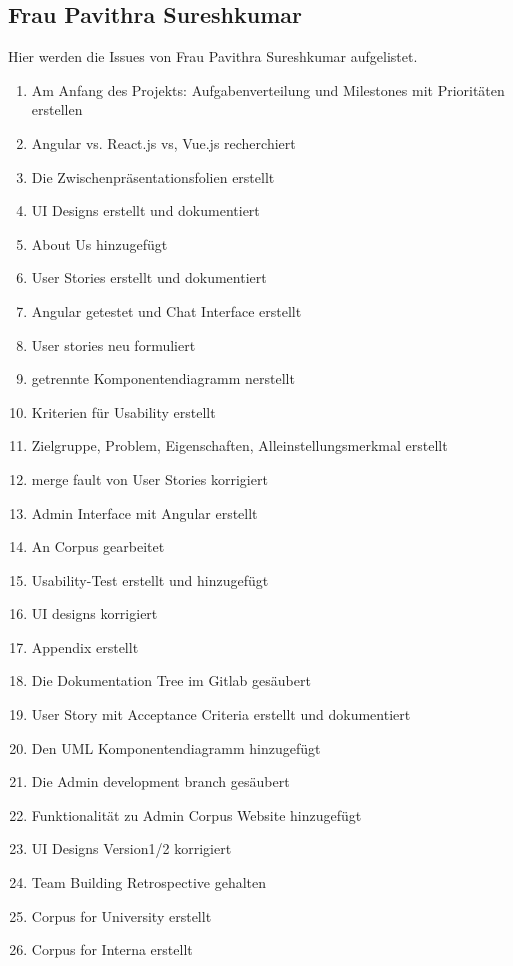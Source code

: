 \subsection{Frau Pavithra Sureshkumar}
Hier werden die Issues von Frau Pavithra Sureshkumar aufgelistet.
\begin{enumerate}
    \item Am Anfang des Projekts: Aufgabenverteilung und Milestones mit Prioritäten erstellen 
    \item Angular vs. React.js vs, Vue.js recherchiert
    \item Die Zwischenpräsentationsfolien erstellt
    \item UI Designs erstellt und dokumentiert
    \item About Us hinzugefügt
    \item User Stories erstellt und dokumentiert
    \item Angular getestet und Chat Interface erstellt
    \item User stories neu formuliert
    \item getrennte Komponentendiagramm nerstellt
    \item Kriterien für Usability erstellt
    \item Zielgruppe, Problem, Eigenschaften, Alleinstellungsmerkmal erstellt
    \item merge fault von User Stories korrigiert
    \item Admin Interface mit Angular erstellt
    \item An Corpus gearbeitet
    \item Usability-Test erstellt und hinzugefügt
    \item UI designs korrigiert
    \item Appendix erstellt
    \item Die Dokumentation Tree im Gitlab gesäubert
    \item User Story mit Acceptance Criteria erstellt und dokumentiert
    \item Den UML Komponentendiagramm hinzugefügt
    \item Die Admin development branch gesäubert
    \item Funktionalität zu Admin Corpus Website hinzugefügt
    \item UI Designs Version1/2 korrigiert 
    \item Team Building Retrospective gehalten
    \item Corpus for University erstellt
    \item Corpus for Interna erstellt

\end{enumerate}
